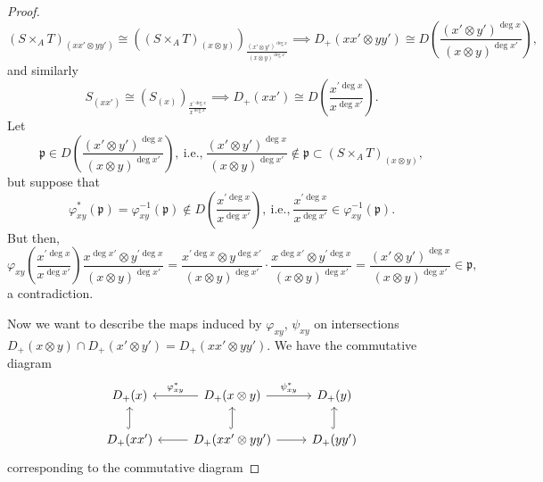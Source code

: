 \documentclass[10pt]{article}
\theoremstyle{definition}
\theoremstyle{remark}
\numberwithin{equation}{section}
\numberwithin{figure}{subsubsection}
\begin{document}
\begin{proof}
  \begin{equation*}
    (S \times_A T)_{(xx' \otimes yy')} \cong ((S \times_A T)_{(x \otimes y)})_{\frac{(x' \otimes y')^{\deg x}}{(x \otimes y)^{\deg x'}}} \implies D_+(xx' \otimes yy') \cong D\left( \frac{(x' \otimes y')^{\deg x}}{(x \otimes y)^{\deg x'}} \right),
  \end{equation*}
  and similarly
  \begin{equation}\label{Sxxiso}
    S_{(xx')} \cong (S_{(x)})_{\frac{x^{\prime\deg x}}{x^{\deg x'}}} \implies D_+(xx') \cong D\left(\frac{x^{\prime\deg x}}{x^{\deg x'}}\right).
  \end{equation}
  Let
  \begin{equation*}
    \mathfrak{p} \in D\left( \frac{(x' \otimes y')^{\deg x}}{(x \otimes y)^{\deg x'}} \right),~\text{i.e.,}~\frac{(x' \otimes y')^{\deg x}}{(x \otimes y)^{\deg x'}} \notin \mathfrak{p} \subset (S \times_A T)_{(x \otimes y)},
  \end{equation*}
  but suppose that
  \begin{equation*}
    \varphi^*_{xy}(\mathfrak{p}) = \varphi^{-1}_{xy}(\mathfrak{p}) \notin D\left(\frac{x^{\prime\deg x}}{x^{\deg x'}}\right),~\text{i.e.,}~\frac{x^{\prime\deg x}}{x^{\deg x'}} \in \varphi^{-1}_{xy}(\mathfrak{p}).
  \end{equation*}
  But then,
  \begin{equation*}
    \varphi_{xy}\left( \frac{x^{\prime\deg x}}{x^{\deg x'}} \right)\frac{x^{\deg x'} \otimes y^{\prime\deg x}}{(x \otimes y)^{\deg x'}} = \frac{x^{\prime\deg x} \otimes y^{\deg x'}}{(x \otimes y)^{\deg x'}}\cdot\frac{x^{\deg x'} \otimes y^{\prime\deg x}}{(x \otimes y)^{\deg x'}} = \frac{(x' \otimes y')^{\deg x}}{(x \otimes y)^{\deg x'}} \in \mathfrak{p},
  \end{equation*}
  a contradiction.
  \par Now we want to describe the maps induced by $\varphi_{xy}$, $\psi_{xy}$ on intersections $D_+(x \otimes y) \cap D_+(x' \otimes y') = D_+(xx' \otimes yy')$. We have the commutative diagram
  \begin{equation*}
    \begin{tikzcd}
      D_+(x) & \arrow{l}[swap]{\varphi^*_{xy}} D_+(x \otimes y) \rar{\psi^*_{xy}} & D_+(y)\\
      D_+(xx')\uar[hook] & \arrow{l} D_+(xx' \otimes yy') \uar[hook]\rar & D_+(yy')\uar[hook]
    \end{tikzcd}
  \end{equation*}
  corresponding to the commutative diagram

\end{proof}
\end{document}
